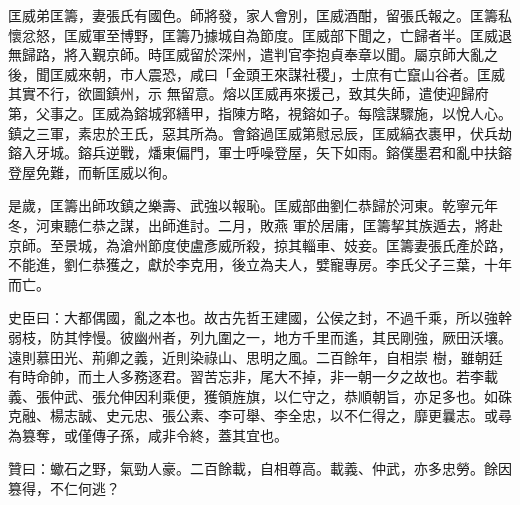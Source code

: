 \begin{pinyinscope}
 匡威弟匡籌，妻張氏有國色。師將發，家人會別，匡威酒酣，留張氏報之。匡籌私懷忿怒，匡威軍至博野，匡籌乃據城自為節度。匡威部下聞之，亡歸者半。匡威退無歸路，將入覲京師。時匡威留於深州，遣判官李抱貞奉章以聞。屬京師大亂之後，聞匡威來朝，市人震恐，咸曰「金頭王來謀社稷」，士庶有亡竄山谷者。匡威其實不行，欲圖鎮州，示
 無留意。熔以匡威再來援己，致其失師，遣使迎歸府第，父事之。匡威為鎔城郛繕甲，指陳方略，視鎔如子。每陰謀驟施，以悅人心。鎮之三軍，素忠於王氏，惡其所為。會鎔過匡威第慰忌辰，匡威縞衣裹甲，伏兵劫鎔入牙城。鎔兵逆戰，燔東偏門，軍士呼噪登屋，矢下如雨。鎔僕墨君和亂中扶鎔登屋免難，而斬匡威以徇。



 是歲，匡籌出師攻鎮之樂壽、武強以報恥。匡威部曲劉仁恭歸於河東。乾寧元年冬，河東聽仁恭之謀，出師進討。二月，敗燕
 軍於居庸，匡籌挈其族遁去，將赴京師。至景城，為滄州節度使盧彥威所殺，掠其輜車、妓妾。匡籌妻張氏產於路，不能進，劉仁恭獲之，獻於李克用，後立為夫人，嬖寵專房。李氏父子三葉，十年而亡。



 史臣曰：大都偶國，亂之本也。故古先哲王建國，公侯之封，不過千乘，所以強幹弱枝，防其悖慢。彼幽州者，列九圍之一，地方千里而遙，其民剛強，厥田沃壤。遠則慕田光、荊卿之義，近則染祿山、思明之風。二百餘年，自相崇
 樹，雖朝廷有時命帥，而土人多務逐君。習苦忘非，尾大不掉，非一朝一夕之故也。若李載義、張仲武、張允伸因利乘便，獲領旌旗，以仁守之，恭順朝旨，亦足多也。如硃克融、楊志誠、史元忠、張公素、李可舉、李全忠，以不仁得之，靡更曩志。或尋為篡奪，或僅傳子孫，咸非令終，蓋其宜也。



 贊曰：蠍石之野，氣勁人豪。二百餘載，自相尊高。載義、仲武，亦多忠勞。餘因篡得，不仁何逃？



\end{pinyinscope}